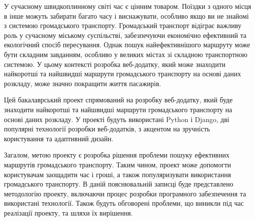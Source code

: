 \intro

У сучасному швидкоплинному світі час є цінним товаром. Поїздки з одного місця в інше можуть забирати багато часу і виснажувати, особливо якщо ви не знайомі з системою громадського транспорту. Громадський транспорт відіграє важливу роль у сучасному міському суспільстві, забезпечуючи економічно ефективний та екологічний спосіб пересування. Однак пошук найефективнішого маршруту може бути складним завданням, особливо у великих містах зі складною транспортною системою. У цьому контексті розробка веб-додатку, який може знаходити найкоротші та найшвидші маршрути громадського транспорту на основі даних розкладу, може значно покращити життя пасажирів.


Цей бакалаврський проект спрямований на розробку веб-додатку, який буде знаходити найкоротші та найшвидші маршрути громадського транспорту на основі даних розкладу. У проекті будуть використані Python і Django, дві популярні технології розробки веб-додатків, з акцентом на зручність користування та адаптивний дизайн.

Загалом, метою проекту є розробка рішення проблеми пошуку ефективних маршрутів громадського транспорту. Таким чином, проект може допомогти користувачам заощадити час і гроші, а також популяризувати використання громадського транспорту. В даній пояснювальній записці буде представлено методологію проекту, включаючи процес розробки програмного забезпечення та використані технології. Також будуть обговорені проблеми, що виникли під час реалізації проекту, та шляхи їх вирішення.
